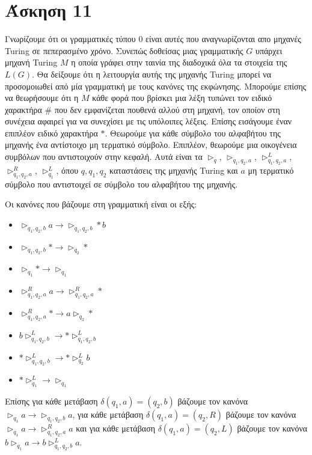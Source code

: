 \documentclass[a4paper, oneside, 11pt]{article}
\theoremstyle{definition}
\begin{document}
\section*{Άσκηση 11}
Γνωρίζουμε ότι οι γραμματικές τύπου $0$ είναι αυτές που αναγνωρίζονται απο μηχανές Turing σε πεπερασμένο χρόνο. Συνεπώς δοθείσας μιας γραμματικής $G$ υπάρχει μηχανή Turing
$M$ η οποία γράφει στην ταινία της διαδοχικά όλα τα στοιχεία της $L(G)$. Θα δείξουμε ότι η λειτουργία αυτής της μηχανής Turing μπορεί να προσομοιωθεί από μία γραμματική
με τους κανόνες της εκφώνησης. Μπορούμε επίσης να θεωρήσουμε ότι η $M$ κάθε φορά που βρίσκει μια λέξη τυπώνει τον ειδικό χαρακτήρα $\#$ που δεν εμφανίζεται πουθενά αλλού στη
μηχανή, τον οποίον στη συνέχεια αφαιρεί για να
συνεχίσει με τις υπόλοιπες λέξεις. Επίσης εισάγουμε έναν επιπλέον ειδικό χαρακτήρα $*$. 
Θεωρούμε για κάθε σύμβολο του αλφαβήτου της μηχανής ένα αντίστοιχο μη τερματικό σύμβολο. Επιπλέον, θεωρούμε μια οικογένεια συμβόλων που
αντιστοιχούν στην κεφαλή. Αυτά είναι τα $\triangleright_q$, $\triangleright_{q_1,q_2,a}$, $\triangleright_{q_1,q_2,a}^L$, $\triangleright_{q_1,q_2,a}^R$, $\triangleright_{q_1}^L$, όπου $q,q_1,q_2$
καταστάσεις της μηχανής Turing και $a$ μη τερματικό σύμβολο που αντιστοιχεί σε σύμβολο του αλφαβήτου της μηχανής.

Οι κανόνες που βάζουμε στη γραμματική είναι οι εξής:
\begin{itemize}
\item{$\triangleright_{q_1,q_2,b} a\rightarrow \triangleright_{q_1,q_2,b}*b$}
\item{$\triangleright_{q_1,q_2,b}*\rightarrow\triangleright_{q_2}*$}
\item{$\triangleright_{q_1}*\rightarrow\triangleright_{q_1}$}
\item{$\triangleright_{q_1,q_2,a}^R a\rightarrow \triangleright_{q_1,q_2,a}^R*$}
\item{$\triangleright_{q_1,q_2,a}^R*\rightarrow a\triangleright_{q_2}*$}
\item{$b\triangleright_{q_1,q_2,b}^L\rightarrow *\triangleright_{q_1,q_2,b}^L$}
\item{$*\triangleright_{q_1,q_2,b}^L\rightarrow *\triangleright_{q_2}^L b$}
\item{$*\triangleright_{q_1}^L\rightarrow \triangleright_{q_1}$}
\end{itemize}

Επίσης για κάθε μετάβαση $\delta(q_1,a)=(q_2,b)$ βάζουμε τον κανόνα $\triangleright_{q_1}a\rightarrow \triangleright_{q_1,q_2,b}a$,
για κάθε μετάβαση $\delta(q_1,a)=(q_2,R)$ βάζουμε τον κανόνα $\triangleright_{q_1}a\rightarrow\triangleright_{q_1,q_2,a}^R a$
και για κάθε μετάβαση $\delta(q_1,a)=(q_2,L)$ βάζουμε τον κανόνα $b\triangleright_{q_1}a\rightarrow b\triangleright_{q_1,q_2,b}^L a$.
\end{document}
